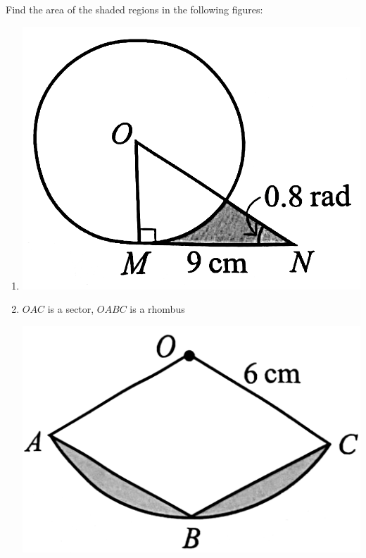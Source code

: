 \documentclass{report}
\begin{document}
Find the area of the shaded regions in the following figures:
\begin{multicols}{2}
	\begin{enumerate}[label=(\alph*)]
		\item \includegraphics[scale=0.12,valign=t]{assets/8-15.png}
		\item $OAC$ is a sector, $OABC$ is a rhombus
		              
		      \vspace{0.5em}
		      \includegraphics[scale=0.12]{assets/8-16.png}
	\end{enumerate}
\end{multicols}

\newpage

\end{document}
